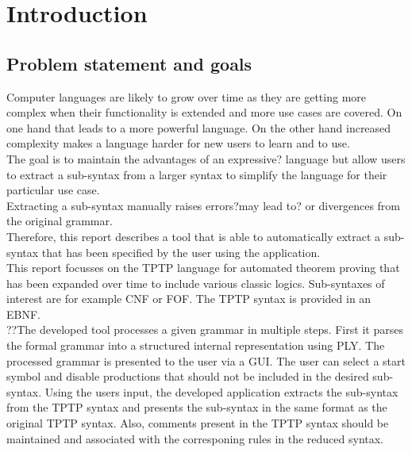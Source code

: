 
\chapter{Introduction}\label{cha:Introduction}

\section{Problem statement and goals}\label{sec:Aufgabenstellung}
Computer languages are likely to grow over time as they are getting more complex when their functionality is extended and more use cases are covered.
On one hand that leads to a more powerful language.
On the other hand increased complexity makes a language harder for new users to learn and to use.\\
The goal is to maintain the advantages of an expressive? language but allow users to extract a sub-syntax from a larger syntax to simplify the language for their particular use case. \\
Extracting a sub-syntax manually raises errors?may lead to? or divergences from the original grammar.\\
Therefore, this report describes a tool that is able to automatically extract a sub-syntax that has been specified by the user using the application.\\
This report focusses on the \acf{TPTP} language for automated theorem proving that has been expanded over time to include various classic logics.
Sub-syntaxes of interest are for example \ac{CNF} or \ac{FOF}.
The \ac{TPTP} syntax is provided in an \acf{EBNF}.\\
??The developed tool processes a given grammar in multiple steps.
First it parses the formal grammar into a structured internal representation using \ac{PLY}.
The processed grammar is presented to the user via a GUI. The user can select a start symbol and disable productions that should not be included in the desired sub-syntax.
Using the users input, the developed application extracts the sub-syntax from the \ac{TPTP} syntax and presents the sub-syntax in the same format as the original \ac{TPTP} syntax.
Also, comments present in the \ac{TPTP} syntax should be maintained and associated with the corresponing rules in the reduced syntax.

